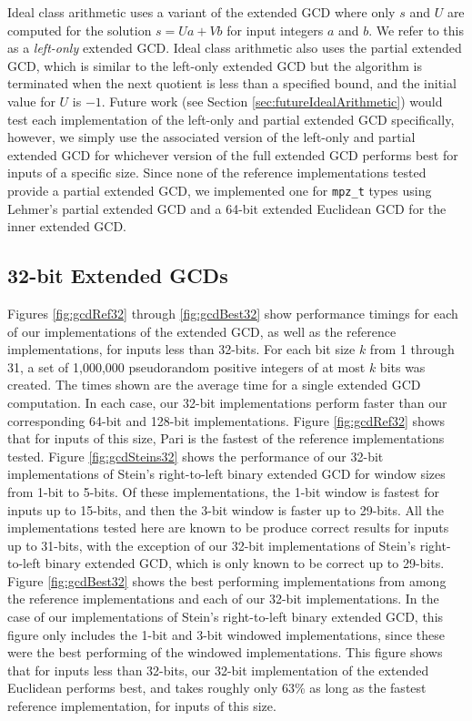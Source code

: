 \documentclass{ucalgthes1}
\theoremstyle{definition}
\begin{document}
Ideal class arithmetic uses a variant of the extended GCD where only $s$ and $U$ are computed for the solution $s = Ua + Vb$ for input integers $a$ and $b$.   We refer to this as a \emph{left-only} extended GCD.  Ideal class arithmetic also uses the partial extended GCD, which is similar to the left-only extended GCD but the algorithm is terminated when the next quotient is less than a specified bound, and the initial value for $U$ is $-1$.  Future work (see Section \ref{sec:futureIdealArithmetic}) would test each implementation of the left-only and partial extended GCD specifically, however, we simply use the associated version of the left-only and partial extended GCD for whichever version of the full extended GCD performs best for inputs of a specific size.  Since none of the reference implementations tested provide a partial extended GCD, we implemented one for \texttt{mpz\_t} types using Lehmer's partial extended GCD and a 64-bit extended Euclidean GCD for the inner extended GCD.

\subsection{32-bit Extended GCDs}

Figures \ref{fig:gcdRef32} through \ref{fig:gcdBest32} show performance timings for each of our implementations of the extended GCD, as well as the reference implementations, for inputs less than 32-bits. For each bit size $k$ from 1 through 31, a set of 1,000,000 pseudorandom positive integers of at most $k$ bits was created.  The times shown are the average time for a single extended GCD computation.  In each case, our 32-bit implementations perform faster than our corresponding 64-bit and 128-bit implementations.  Figure \ref{fig:gcdRef32} shows that for inputs of this size, Pari is the fastest of the reference implementations tested.  Figure \ref{fig:gcdSteins32} shows the performance of our 32-bit implementations of Stein's right-to-left binary extended GCD for window sizes from 1-bit to 5-bits.  Of these implementations, the 1-bit window is fastest for inputs up to 15-bits, and then the 3-bit window is faster up to 29-bits.  All the implementations tested here are known to be produce correct results for inputs up to 31-bits, with the exception of our 32-bit implementations of Stein's right-to-left binary extended GCD, which is only known to be correct up to 29-bits.  Figure \ref{fig:gcdBest32} shows the best performing implementations from among the reference implementations and each of our 32-bit implementations.  In the case of our implementations of Stein's right-to-left binary extended GCD, this figure only includes the 1-bit and 3-bit windowed implementations, since these were the best performing of the windowed implementations.  This figure shows that for inputs less than 32-bits, our 32-bit implementation of the extended Euclidean performs best, and takes roughly only 63\% as long as the fastest reference implementation, for inputs of this size.
\end{document}
